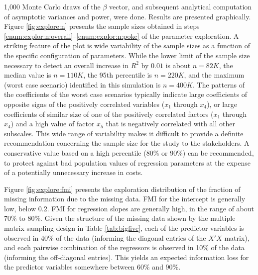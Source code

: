 \documentclass[11pt]{asaproc}
\begin{document}
1,000 Monte Carlo draws of the $\beta$ vector, and subsequent analytical computation of asymptotic variances and power, were done.
Results are presented graphically. Figure \ref{fig:explore:n} presents the sample sizes obtained in steps
\ref{enum:explor:n:overall}--\ref{enum:explor:n:poke} of the parameter exploration. A striking feature of the plot
is wide variability of the sample sizes as a function of the specific configuration of parameters. While the lower limit
of the sample size necessary to detect an overall increase in $R^2$ by $0.01$ is about $n=82K$, the median value
is $n=110K$, the 95th percentile is $n=220K$, and the maximum (worst case scenario) identified in this simulation is
$n=400K$. The patterns of the coefficients of the worst case scenarios typically indicate large coefficients of opposite signs
of the positively correlated variables ($x_1$ through $x_4$), or large coefficients of similar size of one of the positively
correlated factors ($x_1$ through $x_4$) and a high value of factor $x_5$ that is negatively correlated with all other subscales.
This wide range of variability makes it difficult to provide a definite recommendation concerning the sample
size for the study to the stakeholders. A conservative value based on a high percentile (80\% or 90\%) can be recommended,
to protect against bad population values of regression parameters at the expense of a potentially unnecessary increase in costs.

Figure \ref{fig:explore:fmi} presents the exploration distribution of the fraction of missing information
due to the missing data. FMI for the intercept is generally low, below 0.2. FMI for regression slopes are generally high,
in the range of about 70\% to 80\%. Given the structure of the missing data shown by the
multiple matrix sampling design in Table \ref{tab:bigfive},
each of the predictor variables is observed in 40\% of the data (informing the diagonal entries of the $X'X$ matrix),
and each pairwise combination of the regressors is observed in 10\% of the data (informing the off-diagonal entries).
This yields an expected information loss for the predictor variables somewhere between 60\% and 90\%.
\end{document}
